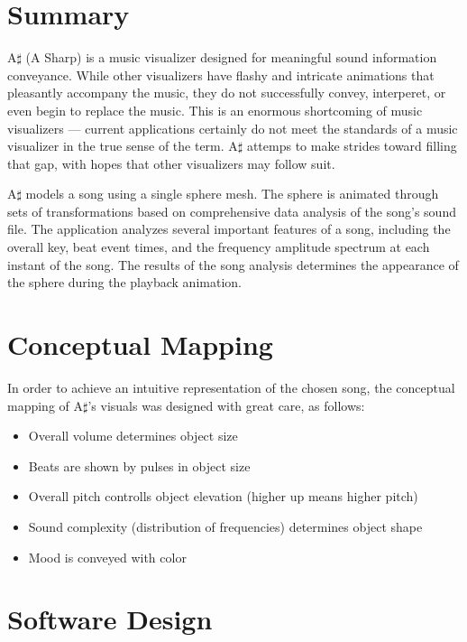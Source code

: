 \documentclass{article}
\begin{document}
\section{Summary}

A$\sharp$ (A Sharp) is a music visualizer designed for meaningful sound information conveyance. While other visualizers have flashy and intricate animations that pleasantly accompany the music, they do not successfully convey, interperet, or even begin to replace the music. This is an enormous shortcoming of music visualizers --- current applications certainly do not meet the standards of a music visualizer in the true sense of the term. A$\sharp$ attemps to make strides toward filling that gap, with hopes that other visualizers may follow suit.

A$\sharp$ models a song using a single sphere mesh. The sphere is animated through sets of transformations based on comprehensive data analysis of the song's sound file. The application analyzes several important features of a song, including the overall key, beat event times, and the frequency amplitude spectrum at each instant of the song. The results of the song analysis determines the appearance of the sphere during the playback animation.

\section{Conceptual Mapping}

In order to achieve an intuitive representation of the chosen song, the conceptual mapping of A$\sharp$'s visuals was designed with great care, as follows:

\begin{itemize}
    \item Overall volume determines object size
    \item Beats are shown by pulses in object size
    \item Overall pitch controlls object elevation (higher up means higher pitch)
    \item Sound complexity (distribution of frequencies) determines object shape
    \item Mood is conveyed with color
\end{itemize}

\section{Software Design}
\end{document}
